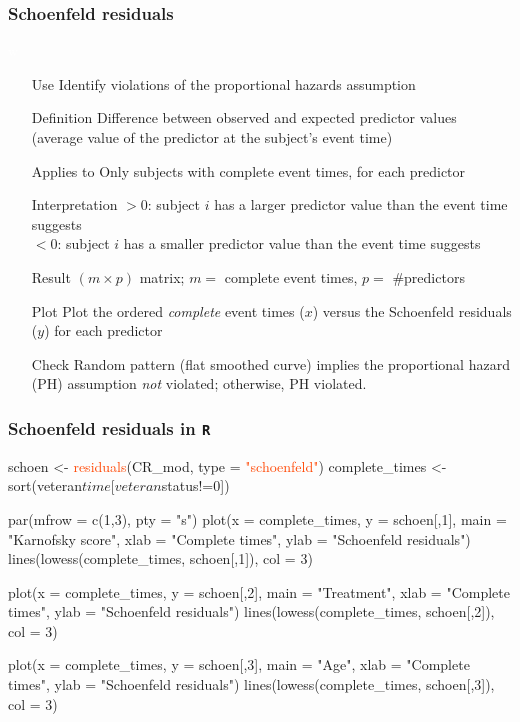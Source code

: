 \begin{frame}
\frametitle{Schoenfeld residuals}
\hspace*{-0.3in}
\begin{minipage}{0.12\textwidth}
\textcolor{white}{w}
\end{minipage}
\begin{minipage}{0.91\textwidth}
\small{
\begin{itemize}
\item[Use] Identify violations of the proportional hazards assumption
\item[Definition] Difference between observed and expected predictor values (average value of the predictor at the subject's event time)
\item[Applies to] Only subjects with complete event times, for each predictor
\item[Interpretation] $>0$: subject $i$ has a larger predictor value than the event time suggests \\
                      $<0$: subject $i$ has a smaller predictor value than the event time suggests
\item[Result] $(m\times p)$ matrix; $m=$ complete event times, $p=$ \#predictors
\item[Plot] Plot the ordered \emph{complete} event times ($x$) versus the Schoenfeld residuals ($y$) for each predictor
\item[Check] Random pattern (flat smoothed curve) implies the proportional hazard (PH) assumption \emph{not} violated; otherwise, PH violated.
\end{itemize}}
\end{minipage}
\end{frame}

\begin{frame}[fragile]
\frametitle{Schoenfeld  residuals in \texttt{R}}
\begin{Rcode}{-0.06}
schoen <- \textcolor{OrangeRed}{residuals}(CR_mod, type = \textcolor{OrangeRed}{"schoenfeld"})
complete_times <- sort(veteran$time[veteran$status!=0])

par(mfrow = c(1,3), pty = "s")
plot(x = complete_times, y = schoen[,1], main = "Karnofsky score",
     xlab = "Complete times", ylab = "Schoenfeld residuals")
lines(lowess(complete_times, schoen[,1]), col = 3)

plot(x = complete_times, y = schoen[,2], main = "Treatment",
     xlab = "Complete times", ylab = "Schoenfeld residuals")
lines(lowess(complete_times, schoen[,2]), col = 3)

plot(x = complete_times, y = schoen[,3], main = "Age",
     xlab = "Complete times", ylab = "Schoenfeld residuals")
lines(lowess(complete_times, schoen[,3]), col = 3)
\end{Rcode}
\end{frame}

